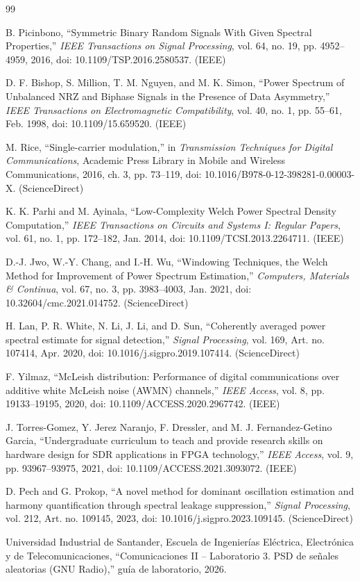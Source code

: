 \documentclass[journal]{IEEEtran}
\begin{document}
\begin{thebibliography}{99}

B. Picinbono, ``Symmetric Binary Random Signals With Given Spectral Properties,'' \textit{IEEE Transactions on Signal Processing}, vol. 64, no. 19, pp. 4952--4959, 2016, doi: 10.1109/TSP.2016.2580537. (IEEE)

D. F. Bishop, S. Million, T. M. Nguyen, and M. K. Simon, ``Power Spectrum of Unbalanced NRZ and Biphase Signals in the Presence of Data Asymmetry,'' \textit{IEEE Transactions on Electromagnetic Compatibility}, vol. 40, no. 1, pp. 55--61, Feb. 1998, doi: 10.1109/15.659520. (IEEE)

M. Rice, ``Single-carrier modulation,'' in \textit{Transmission Techniques for Digital Communications}, Academic Press Library in Mobile and Wireless Communications, 2016, ch. 3, pp. 73--119, doi: 10.1016/B978-0-12-398281-0.00003-X. (ScienceDirect)

K. K. Parhi and M. Ayinala, ``Low-Complexity Welch Power Spectral Density Computation,'' \textit{IEEE Transactions on Circuits and Systems I: Regular Papers}, vol. 61, no. 1, pp. 172--182, Jan. 2014, doi: 10.1109/TCSI.2013.2264711. (IEEE)

D.-J. Jwo, W.-Y. Chang, and I.-H. Wu, ``Windowing Techniques, the Welch Method for Improvement of Power Spectrum Estimation,'' \textit{Computers, Materials \& Continua}, vol. 67, no. 3, pp. 3983--4003, Jan. 2021, doi: 10.32604/cmc.2021.014752. (ScienceDirect)

H. Lan, P. R. White, N. Li, J. Li, and D. Sun, ``Coherently averaged power spectral estimate for signal detection,'' \textit{Signal Processing}, vol. 169, Art. no. 107414, Apr. 2020, doi: 10.1016/j.sigpro.2019.107414. (ScienceDirect)

F. Yilmaz, ``McLeish distribution: Performance of digital communications over additive white McLeish noise (AWMN) channels,'' \textit{IEEE Access}, vol. 8, pp. 19133--19195, 2020, doi: 10.1109/ACCESS.2020.2967742. (IEEE)

J. Torres-Gomez, Y. Jerez Naranjo, F. Dressler, and M. J. Fernandez-Getino Garcia, ``Undergraduate curriculum to teach and provide research skills on hardware design for SDR applications in FPGA technology,'' \textit{IEEE Access}, vol. 9, pp. 93967--93975, 2021, doi: 10.1109/ACCESS.2021.3093072. (IEEE)

D. Pech and G. Prokop, ``A novel method for dominant oscillation estimation and harmony quantification through spectral leakage suppression,'' \textit{Signal Processing}, vol. 212, Art. no. 109145, 2023, doi: 10.1016/j.sigpro.2023.109145. (ScienceDirect)

Universidad Industrial de Santander, Escuela de Ingenierías Eléctrica, Electrónica y de Telecomunicaciones, ``Comunicaciones II -- Laboratorio 3. PSD de señales aleatorias (GNU Radio),'' guía de laboratorio, 2026.

\end{thebibliography}
\end{document}
